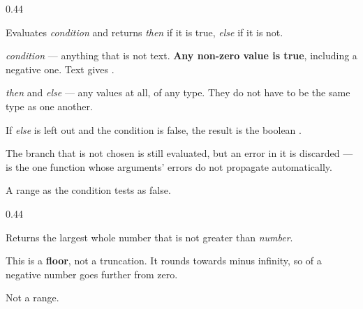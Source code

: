 \begin{ccexamples}{0.44\linewidth}
\end{ccexamples}


Evaluates \emph{condition} and returns \emph{then} if it is true, \emph{else}
if it is not.

\begin{ccsteps}
\item \emph{condition} --- anything that is not text. \textbf{Any non-zero
value is true}, including a negative one. Text gives .
\item \emph{then} and \emph{else} --- any values at all, of any type. They do
not have to be the same type as one another.
\end{ccsteps}

\begin{ccsteps}
\item If \emph{else} is left out and the condition is false, the result is the
boolean .
\item The branch that is not chosen is still evaluated, but an error in it is
discarded ---  is the one function whose arguments' errors do not
propagate automatically.
\item A range as the condition tests as false.
\end{ccsteps}

\begin{ccexamples}{0.44\linewidth}
\end{ccexamples}


Returns the largest whole number that is not greater than \emph{number}.

\begin{ccsteps}
\item This is a \textbf{floor}, not a truncation. It rounds towards minus
infinity, so  of a negative number goes further from zero.
\item Not a range.
\end{ccsteps}

